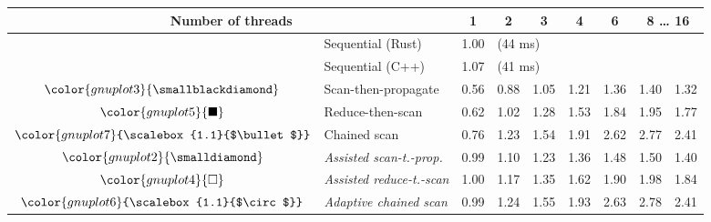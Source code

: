 \begin{tabular}{clrrrrrrr}
\toprule
\multicolumn{2}{c}{\textbf{Number of threads}} & \multicolumn{1}{c}{\textbf{ 1 }} & \multicolumn{1}{c}{\textbf{ 2 }} & \multicolumn{1}{c}{\textbf{ 3 }} & \multicolumn{1}{c}{\textbf{ 4 }} & \multicolumn{1}{c}{\textbf{ 6 }} & \multicolumn{2}{c}{\textbf{ 8 } \dots \textbf{ 16 }} \\
\midrule
& Sequential (Rust) & \multicolumn{1}{r}{ 1.00 } & \multicolumn{ 6 }{l}{(44 ms)} \\
& Sequential (C++) & \multicolumn{1}{r}{ 1.07 } & \multicolumn{ 6 }{l}{(41 ms)} \\
\rowcolor{gnuplot3!10}$\color{gnuplot3}{\smallblackdiamond}$ & Scan-then-propagate & \cellcolor{gnuplot3!10} 0.56 & \cellcolor{gnuplot3!10} 0.88 & \cellcolor{gnuplot3!10} 1.05 & \cellcolor{gnuplot3!10} 1.21 & \cellcolor{gnuplot3!10} 1.36 & \cellcolor{gnuplot3!10} 1.40 & \cellcolor{gnuplot3!10} 1.32 \\
\rowcolor{gnuplot5!10}$\color{gnuplot5}{\blacksquare}$ & Reduce-then-scan & \cellcolor{gnuplot5!10} 0.62 & \cellcolor{gnuplot5!10} 1.02 & \cellcolor{gnuplot5!10} 1.28 & \cellcolor{gnuplot5!10} 1.53 & \cellcolor{gnuplot5!10} 1.84 & \cellcolor{gnuplot5!10} 1.95 & \cellcolor{gnuplot5!10} 1.77 \\
\rowcolor{gnuplot7!10}$\color{gnuplot7}{\scalebox{1.1}{$\bullet$}}$ & Chained scan & \cellcolor{gnuplot7!10} 0.76 & \cellcolor{gnuplot7!10} 1.23 & \cellcolor{gnuplot7!10} 1.54 & \cellcolor{gnuplot7!10} 1.91 & \cellcolor{gnuplot7!10} 2.62 & \cellcolor{gnuplot7!10} 2.77 & \cellcolor{gnuplot7!10} 2.41 \\
\rowcolor{gnuplot2!30}$\color{gnuplot2}{\smalldiamond}$ & \textit{Assisted scan-t.-prop.} & \cellcolor{gnuplot2!30} 0.99 & \cellcolor{gnuplot2!30} 1.10 & \cellcolor{gnuplot2!30} 1.23 & \cellcolor{gnuplot2!30} 1.36 & \cellcolor{gnuplot2!30} 1.48 & \cellcolor{gnuplot2!30} 1.50 & \cellcolor{gnuplot2!30} 1.40 \\
\rowcolor{gnuplot4!30}$\color{gnuplot4}{\square}$ & \textit{Assisted reduce-t.-scan} & \cellcolor{gnuplot4!30} 1.00 & \cellcolor{gnuplot4!30} 1.17 & \cellcolor{gnuplot4!30} 1.35 & \cellcolor{gnuplot4!30} 1.62 & \cellcolor{gnuplot4!30} 1.90 & \cellcolor{gnuplot4!30} 1.98 & \cellcolor{gnuplot4!30} 1.84 \\
\rowcolor{gnuplot6!30}$\color{gnuplot6}{\scalebox{1.1}{$\circ$}}$ & \textit{Adaptive chained scan} & \cellcolor{gnuplot6!30} 0.99 & \cellcolor{gnuplot6!30} 1.24 & \cellcolor{gnuplot6!30} 1.55 & \cellcolor{gnuplot6!30} 1.93 & \cellcolor{gnuplot6!30} 2.63 & \cellcolor{gnuplot6!30} 2.78 & \cellcolor{gnuplot6!30} 2.41 \\

\end{tabular}
